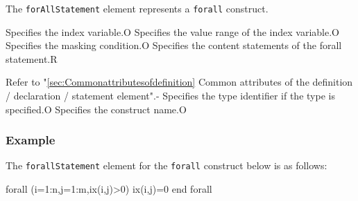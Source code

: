 The {\tt forAllStatement} element represents a {\tt forall} construct.


\begin{XcodeMLChildElements}
{Specifies the index variable.}{O}
{Specifies the value range of the index variable.}{O}
{Specifies the masking condition.}{O}
{Specifies the content statements of the forall statement.}{R}
\end{XcodeMLChildElements}

\begin{XcodeMLAttributes}
{Refer to "\ref{sec:Commonattributesofdefinition} Common attributes of the definition / declaration / statement element".}{-}
{Specifies the type identifier if the type is specified.}{O}
{Specifies the construct name.}{O}
\end{XcodeMLAttributes}

\subsubsection*{Example}

The {\tt forallStatement} element for the {\tt forall} construct below is as follows:
\vspace{2mm}

\begin{Fexample2008}
forall (i=1:n,j=1:m,ix(i,j)>0)
 ix(i,j)=0
end forall
\end{Fexample2008}
\vspace{1mm}

